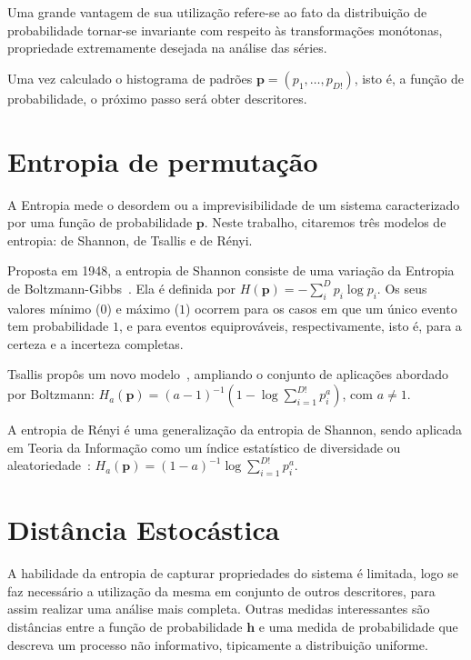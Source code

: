 
Uma grande vantagem de sua utilização refere-se ao fato da distribuição de probabilidade tornar-se invariante com respeito às transformações monótonas, propriedade extremamente desejada na análise das séries.

Uma vez calculado o histograma de padrões $\bm p=(p_1,\dots,p_{D!})$, isto é, a função de probabilidade, o próximo passo será obter descritores.

\section{Entropia de permutação}

A Entropia mede o desordem ou a imprevisibilidade de um sistema caracterizado por uma função de probabilidade $\bm p$.
Neste trabalho, citaremos três modelos de entropia: de Shannon, de Tsallis e de Rényi.

Proposta em 1948, a entropia de Shannon consiste de uma variação da Entropia de Boltzmann-Gibbs~\cite{shannon}.
Ela é definida por $H(\bm p) = -\sum_{i}^{D} p_i \log p_i $.
Os seus valores mínimo ($0$) e máximo ($1$) ocorrem para os casos em que um único evento tem probabilidade $1$, e para eventos equiprováveis, respectivamente, isto é, para a certeza e a incerteza completas. 

Tsallis propôs um novo modelo~\cite{entropyInformation}, ampliando o  conjunto de aplicações abordado por Boltzmann:
$H_a(\bm p) ={(a-1)}^{-1}(1 - \log \sum_{i=1}^{D!}p_i^a)$, com $a \neq 1$.

A entropia de Rényi é uma generalização da entropia de Shannon, sendo aplicada em Teoria da Informação como um índice estatístico de diversidade ou aleatoriedade~\cite{Tsallis1988}: $H_a(\bm p) ={(1-a)^{-1}}\log \sum_{i=1}^{D!}p_i^a$.


\section{Distância Estocástica}

A habilidade da entropia de capturar propriedades do sistema é limitada, logo se faz necessário a utilização da mesma em conjunto de outros descritores, para assim realizar uma análise mais completa.
Outras medidas interessantes são distâncias entre a função de probabilidade $\bm h$ e uma medida de probabilidade que descreva um processo não informativo, tipicamente a distribuição uniforme.

